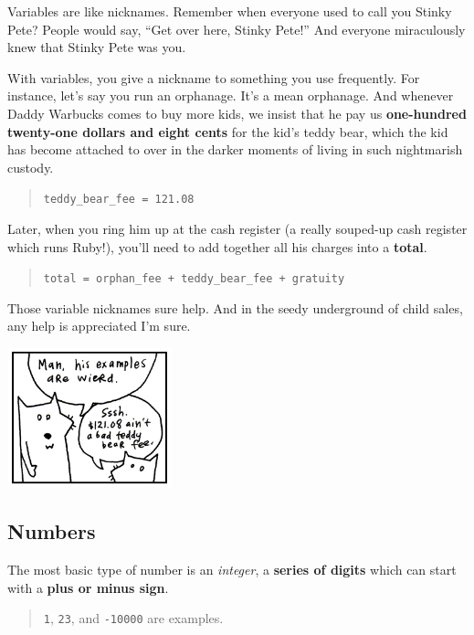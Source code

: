 \documentclass[10pt,twoside]{report}
\begin{document}
Variables are like nicknames.  Remember when everyone used to call you
Stinky Pete? People would say, ``Get over here, Stinky Pete!''  And
everyone miraculously knew that Stinky Pete was you.

With variables, you give a nickname to something you use frequently.
For instance, let's say you run an orphanage.  It's a mean orphanage.
And whenever Daddy Warbucks comes to buy more kids, we insist that he
pay us {\bf one-hundred twenty-one dollars and eight cents} for the
kid's teddy bear, which the kid has become attached to over in the
darker moments of living in such nightmarish custody.

\begin{quote}
\lstinline[breaklines=true]|teddy_bear_fee = 121.08|\end{quote}


Later, when you ring him up at the cash register (a really souped-up
cash register which runs Ruby!), you'll need to add together all his
charges into a {\bf total}.

\begin{quote}
\lstinline[breaklines=true]|total = orphan_fee + teddy_bear_fee + gratuity|\end{quote}


Those variable nicknames sure help.  And in the seedy underground of
child sales, any help is appreciated I'm sure.

	\includegraphics[width=0.3575\textwidth]{cache/8.png}




\subsection{Numbers}



The most basic type of number is an {\em integer}, a {\bf series of
  digits} which can start with a {\bf plus or minus sign}.

\begin{quote}
\lstinline[breaklines=true]|1|, \lstinline[breaklines=true]|23|, and
\lstinline[breaklines=true]|-10000| are examples.\end{quote}
\end{document}
